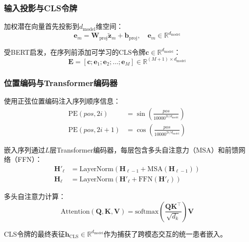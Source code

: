 \documentclass[conference]{IEEEtran}
\begin{document}
\subsubsection{输入投影与CLS令牌}

加权潜在向量首先投影到$d_{\text{model}}$维空间：
\begin{equation}
\mathbf{e}_m = \mathbf{W}_{\text{proj}} \tilde{\mathbf{z}}_m + \mathbf{b}_{\text{proj}}, \quad \mathbf{e}_m \in \mathbb{R}^{d_{\text{model}}}
\end{equation}

受BERT\cite{devlin2018bert}启发，在序列前添加可学习的CLS令牌$\mathbf{c} \in \mathbb{R}^{d_{\text{model}}}$：
\begin{equation}
\mathbf{E} = [\mathbf{c}; \mathbf{e}_1; \mathbf{e}_2; \ldots; \mathbf{e}_M] \in \mathbb{R}^{(M+1) \times d_{\text{model}}}
\end{equation}

\subsubsection{位置编码与Transformer编码器}

使用正弦位置编码注入序列顺序信息：
\begin{equation}
\begin{aligned}
\text{PE}(pos, 2i) &= \sin\left(\frac{pos}{10000^{2i/d_{\text{model}}}}\right) \\
\text{PE}(pos, 2i+1) &= \cos\left(\frac{pos}{10000^{2i/d_{\text{model}}}}\right)
\end{aligned}
\end{equation}

嵌入序列通过$L$层Transformer编码器，每层包含多头自注意力（MSA）和前馈网络（FFN）：
\begin{equation}
\begin{aligned}
\mathbf{H}'_\ell &= \text{LayerNorm}(\mathbf{H}_{\ell-1} + \text{MSA}(\mathbf{H}_{\ell-1})) \\
\mathbf{H}_\ell &= \text{LayerNorm}(\mathbf{H}'_\ell + \text{FFN}(\mathbf{H}'_\ell))
\end{aligned}
\end{equation}

多头自注意力计算：
\begin{equation}
\text{Attention}(\mathbf{Q}, \mathbf{K}, \mathbf{V}) = \text{softmax}\left(\frac{\mathbf{Q}\mathbf{K}^\top}{\sqrt{d_k}}\right) \mathbf{V}
\end{equation}

CLS令牌的最终表征$\mathbf{h}_{\text{CLS}} \in \mathbb{R}^{d_{\text{model}}}$作为捕获了跨模态交互的统一患者嵌入。
\end{document}

